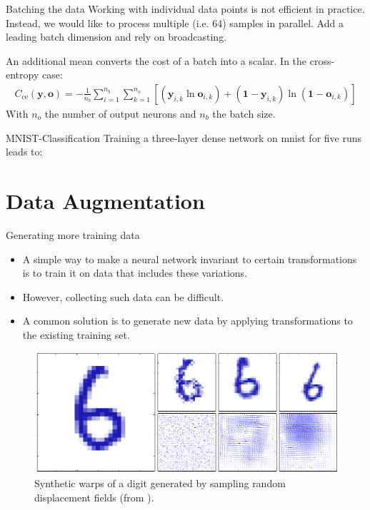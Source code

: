 \documentclass{beamer}
\begin{document}
    \begin{frame}{Batching the data}
      Working with individual data points is not efficient in practice.
      Instead, we would like to process multiple (i.e. 64) samples in parallel. 
      Add a leading batch dimension and rely on broadcasting.

      An additional mean converts the cost of a batch into a scalar.
      In the cross-entropy case:
      \begin{align}
        C_{\text{ce}}(\mathbf{y},\mathbf{o})=-\frac{1}{n_b}\sum_{i=1}^{n_b}\sum_{k=1}^{n_o}[(\mathbf{y}_{i,k}\ln\mathbf{o}_{i,k})+(\mathbf{1}-\mathbf{y}_{i,k})\ln(\mathbf{1}-\mathbf{o}_{i,k})]
      \end{align}
      With $n_o$ the number of output neurons and $n_b$ the batch size.
    \end{frame}

    \begin{frame}{MNIST-Classification}
      Training a three-layer dense network on mnist for five runs leads to:
      \begin{figure}
        
      \end{figure}
    \end{frame}
		
		\section{Data Augmentation}
		
		\begin{frame}{Generating more training data}
    \begin{itemize}
        \item A simple way to make a neural network invariant to certain transformations is to train it on data that includes these variations.
        \item However, collecting such data can be difficult.
        \item A common solution is to generate new data by applying transformations to the existing training set.
    \end{itemize}
    \begin{figure}
        \centering
        \includegraphics[width=0.65\linewidth]{./figures/Figure5_14.pdf}
        \caption{\scriptsize Synthetic warps of a digit generated by sampling random displacement fields (from \cite{bishop2006pattern}).}
    \end{figure}
\end{frame}
\end{document}
